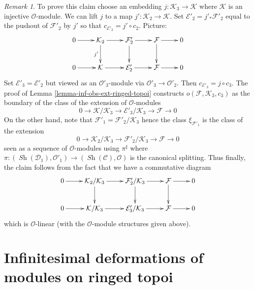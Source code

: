 \documentclass{stacks-project}
\theoremstyle{plain}
\theoremstyle{definition}
\theoremstyle{remark}
\newtheorem{remark}[subsection]{Remark}
\numberwithin{equation}{subsection}
\def\Sh{\mathop{\mathit{Sh}}\nolimits}
\begin{document}
\begin{remark}
\medskip\noindent
To prove this claim choose an embedding $j : \mathcal{K}_3 \to \mathcal{K}$
where $\mathcal{K}$ is an injective $\mathcal{O}$-module.
We can lift $j$ to a map $j' : \mathcal{K}_2 \to \mathcal{K}$.
Set $\mathcal{E}'_2 = j'_*\mathcal{F}'_2$ equal to the pushout
of $\mathcal{F}'_2$ by $j'$ so that $c_{\mathcal{E}'_2} = j' \circ c_2$.
Picture:
$$
\xymatrix{
0 \ar[r] &
\mathcal{K}_2 \ar[r] \ar[d]_{j'} &
\mathcal{F}'_2 \ar[r] \ar[d] &
\mathcal{F} \ar[r] \ar[d] & 0 \\
0 \ar[r] &
\mathcal{K} \ar[r] &
\mathcal{E}'_2 \ar[r] &
\mathcal{F} \ar[r] & 0
}
$$
Set $\mathcal{E}'_3 = \mathcal{E}'_2$ but viewed as an
$\mathcal{O}'_3$-module via $\mathcal{O}'_3 \to \mathcal{O}'_2$.
Then $c_{\mathcal{E}'_3} = j \circ c_3$.
The proof of Lemma \ref{lemma-inf-obs-ext-ringed-topoi} constructs
$o(\mathcal{F}, \mathcal{K}_3, c_3)$
as the boundary of the class of the extension of $\mathcal{O}$-modules
$$
0 \to
\mathcal{K}/\mathcal{K}_3 \to
\mathcal{E}'_3/\mathcal{K}_3 \to
\mathcal{F} \to 0
$$
On the other hand, note that $\mathcal{F}'_1 = \mathcal{F}'_2/\mathcal{K}_3$
hence the class $\xi_{\mathcal{F}'_1}$ is the class
of the extension
$$
0 \to \mathcal{K}_2/\mathcal{K}_3 \to \mathcal{F}'_2/\mathcal{K}_3
\to \mathcal{F} \to 0
$$
seen as a sequence of $\mathcal{O}$-modules using $\pi^\sharp$
where $\pi : (\Sh(\mathcal{D}_1), \mathcal{O}'_1) \to
(\Sh(\mathcal{C}), \mathcal{O})$ is the canonical splitting.
Thus finally, the claim follows from the fact that we have
a commutative diagram
$$
\xymatrix{
0 \ar[r] &
\mathcal{K}_2/\mathcal{K}_3 \ar[r] \ar[d] &
\mathcal{F}'_2/\mathcal{K}_3 \ar[r] \ar[d] &
\mathcal{F} \ar[r] \ar[d] & 0 \\
0 \ar[r] &
\mathcal{K}/\mathcal{K}_3 \ar[r] &
\mathcal{E}'_3/\mathcal{K}_3 \ar[r] &
\mathcal{F} \ar[r] & 0
}
$$
which is $\mathcal{O}$-linear (with the $\mathcal{O}$-module
structures given above).
\end{remark}







\section{Infinitesimal deformations of modules on ringed topoi}
\label{section-deformation-modules-ringed-topoi}
\end{document}
